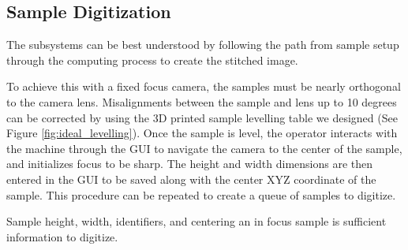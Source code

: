 \documentclass[a4paper,12pt]{article}
\begin{document}
\subsection{Sample Digitization} %
The subsystems can be best understood by following the path from sample setup through the computing process to create the stitched image. 

To achieve this with a fixed focus camera, the samples must be nearly orthogonal to the camera lens. Misalignments between the sample and lens up to 10 degrees can be corrected by using the 3D printed sample levelling table we designed (See Figure \ref{fig:ideal_levelling}).
Once the sample is level, the operator interacts with the machine through the GUI to navigate the camera to the center of the sample, and initializes focus to be sharp. The height and width dimensions are then entered in the GUI
to be saved along with the center XYZ coordinate of the sample. This procedure can be repeated to create a queue of samples to digitize.

Sample height, width, identifiers, and centering an in focus sample is sufficient information to digitize.
\end{document}
